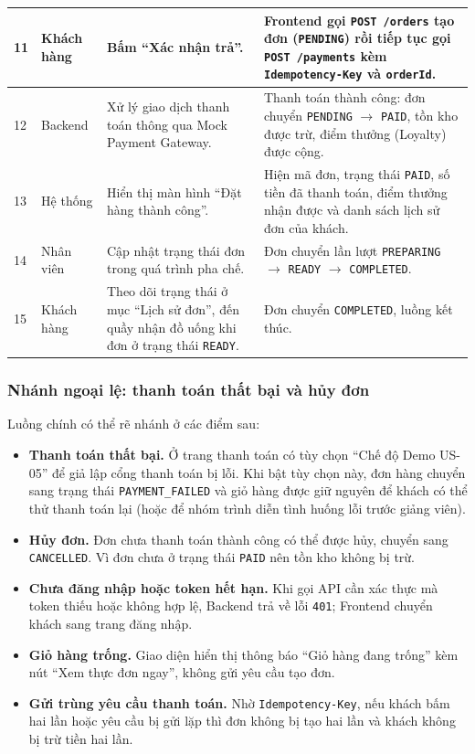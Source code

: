 \begin{longtable}{|p{0.9cm}|p{2.4cm}|p{5.6cm}|p{4.6cm}|}
  \hline
  11 & Khách hàng & Bấm ``Xác nhận trả''. & Frontend gọi \texttt{POST /orders} tạo đơn (\texttt{PENDING}) rồi tiếp tục gọi \texttt{POST /payments} kèm \texttt{Idempotency-Key} và \texttt{orderId}. \\
  \hline
  12 & Backend & Xử lý giao dịch thanh toán thông qua Mock Payment Gateway. & Thanh toán thành công: đơn chuyển \texttt{PENDING} $\rightarrow$ \texttt{PAID}, tồn kho được trừ, điểm thưởng (Loyalty) được cộng. \\
  \hline
  13 & Hệ thống & Hiển thị màn hình ``Đặt hàng thành công''. & Hiện mã đơn, trạng thái \texttt{PAID}, số tiền đã thanh toán, điểm thưởng nhận được và danh sách lịch sử đơn của khách. \\
  \hline
  14 & Nhân viên & Cập nhật trạng thái đơn trong quá trình pha chế. & Đơn chuyển lần lượt \texttt{PREPARING} $\rightarrow$ \texttt{READY} $\rightarrow$ \texttt{COMPLETED}. \\
  \hline
  15 & Khách hàng & Theo dõi trạng thái ở mục ``Lịch sử đơn'', đến quầy nhận đồ uống khi đơn ở trạng thái \texttt{READY}. & Đơn chuyển \texttt{COMPLETED}, luồng kết thúc. \\
  \hline
\end{longtable}

\subsubsection{Nhánh ngoại lệ: thanh toán thất bại và hủy đơn}

Luồng chính có thể rẽ nhánh ở các điểm sau:

\begin{itemize}
  \item \textbf{Thanh toán thất bại.} Ở trang thanh toán có tùy chọn ``Chế độ Demo US-05'' để giả lập cổng thanh toán bị lỗi. Khi bật tùy chọn này, đơn hàng chuyển sang trạng thái \texttt{PAYMENT\_FAILED} và giỏ hàng được giữ nguyên để khách có thể thử thanh toán lại (hoặc để nhóm trình diễn tình huống lỗi trước giảng viên).
  \item \textbf{Hủy đơn.} Đơn chưa thanh toán thành công có thể được hủy, chuyển sang \texttt{CANCELLED}. Vì đơn chưa ở trạng thái \texttt{PAID} nên tồn kho không bị trừ.
  \item \textbf{Chưa đăng nhập hoặc token hết hạn.} Khi gọi API cần xác thực mà token thiếu hoặc không hợp lệ, Backend trả về lỗi \texttt{401}; Frontend chuyển khách sang trang đăng nhập.
  \item \textbf{Giỏ hàng trống.} Giao diện hiển thị thông báo ``Giỏ hàng đang trống'' kèm nút ``Xem thực đơn ngay'', không gửi yêu cầu tạo đơn.
  \item \textbf{Gửi trùng yêu cầu thanh toán.} Nhờ \texttt{Idempotency-Key}, nếu khách bấm hai lần hoặc yêu cầu bị gửi lặp thì đơn không bị tạo hai lần và khách không bị trừ tiền hai lần.
\end{itemize}

